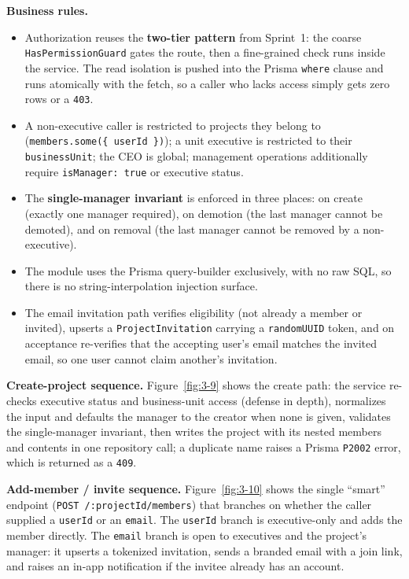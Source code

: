 \textbf{Business rules.}
\begin{itemize}
  \item Authorization reuses the \textbf{two-tier pattern} from Sprint~1: the coarse
    \texttt{HasPermissionGuard} gates the route, then a fine-grained check runs inside the service.
    The read isolation is pushed into the Prisma \texttt{where} clause and runs atomically with the
    fetch, so a caller who lacks access simply gets zero rows or a \texttt{403}.
  \item A non-executive caller is restricted to projects they belong to
    (\texttt{members.some(\{ userId \})}); a unit executive is restricted to their \texttt{businessUnit};
    the CEO is global; management operations additionally require \texttt{isManager: true} or
    executive status.
  \item The \textbf{single-manager invariant} is enforced in three places: on create (exactly one
    manager required), on demotion (the last manager cannot be demoted), and on removal (the last
    manager cannot be removed by a non-executive).
  \item The module uses the Prisma query-builder exclusively, with no raw SQL, so there is no
    string-interpolation injection surface.
  \item The email invitation path verifies eligibility (not already a member or invited), upserts
    a \texttt{ProjectInvitation} carrying a \texttt{randomUUID} token, and on acceptance re-verifies
    that the accepting user's email matches the invited email, so one user cannot claim another's
    invitation.
\end{itemize}

\textbf{Create-project sequence.} Figure~\ref{fig:3-9} shows the create path: the service
re-checks executive status and business-unit access (defense in depth), normalizes the input and
defaults the manager to the creator when none is given, validates the single-manager invariant,
then writes the project with its nested members and contents in one repository call; a duplicate
name raises a Prisma \texttt{P2002} error, which is returned as a \texttt{409}.


\textbf{Add-member / invite sequence.} Figure~\ref{fig:3-10} shows the single ``smart'' endpoint
(\texttt{POST /:projectId/members}) that branches on whether the caller supplied a \texttt{userId} or
an \texttt{email}. The \texttt{userId} branch is executive-only and adds the member directly. The
\texttt{email} branch is open to executives and the project's manager: it upserts a tokenized
invitation, sends a branded email with a join link, and raises an in-app notification if the
invitee already has an account.

